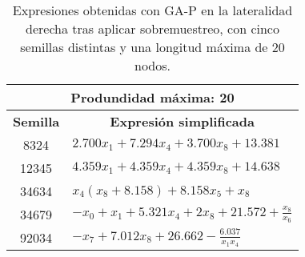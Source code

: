 \begin{table}[H]
\centering
\begin{tabular}{|c|l|}
\hline
\multicolumn{2}{|c|}{\textbf{Produndidad máxima: 20}}                                                   \\ \hline
\textbf{Semilla} & \multicolumn{1}{c|}{\textbf{Expresión simplificada}}                                 \\ \hline
8324             & $2.700 x_{1} + 7.294 x_{4} + 3.700 x_{8} + 13.381$          \\ \hline
12345            & $4.359 x_{1} + 4.359 x_{4} + 4.359 x_{8} + 14.638$                \\ \hline
34634            & $x_{4} \left(x_{8} + 8.158\right) + 8.158 x_{5} + x_{8}$       \\ \hline
34679            & $- x_{0} + x_{1} + 5.321 x_{4} + 2 x_{8} + 21.572 + \frac{x_{8}}{x_{6}}$ \\ \hline
92034            & $- x_{7} + 7.012 x_{8} + 26.662 - \frac{6.037}{x_{1} x_{4}}$          \\ \hline
\end{tabular}%
\caption{Expresiones obtenidas con GA-P en la lateralidad derecha tras aplicar sobremuestreo, con cinco semillas distintas y una longitud máxima de 20 nodos.}\label{table:exp_GAP_over_l1_20}

\end{table}





